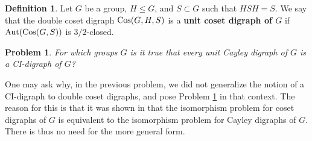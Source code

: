 \documentclass{amsart}
\newtheorem{problem}[thrm]{Problem}
\theoremstyle{definition}
\newtheorem{definition}[thrm]{Definition}
\theoremstyle{remark}
\numberwithin{equation}{section}
\def\Aut{{\rm Aut}}
\def\Cos{{\rm Cos}}
\begin{document}
\begin{definition}
Let $G$ be a group, $H\le G$, and $S\subset G$ such that $HSH = S$.  We say that the double coset digraph $\Cos(G,H,S)$ is a {\bf unit coset digraph of $G$} if $\Aut(\Cos(G,S))$ is $3/2$-closed.
\end{definition}

\begin{problem}\label{unit CI}
For which groups $G$ is it true that every unit Cayley digraph of $G$ is a CI-digraph of $G$?
\end{problem}

One may ask why, in the previous problem, we did not generalize the notion of a CI-digraph to double coset digraphs, and pose Problem \ref{unit CI} in that context.  The reason for this is that it was shown in \cite{BarberDpreprint} that the isomorphism problem for coset digraphs of $G$ is equivalent to the isomorphism problem for Cayley digraphs of $G$.  There is thus no need for the more general form.
\end{document}
